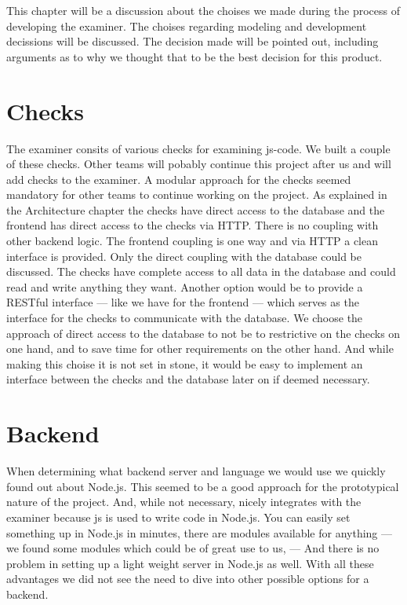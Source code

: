 %

This chapter will be a discussion about the choises we made
during the process of developing the \gls{examiner}.
The choises regarding modeling and development decissions will be discussed.
The decision made will be pointed out,
including arguments as to why we thought
that to be the best decision for this product.

\section{Checks}
The \gls{examiner} consits of various checks for examining \gls{js-code}.
We built a couple of these checks.
Other teams will pobably continue this project after us
and will add checks to the \gls{examiner}.
A modular approach for the checks seemed mandatory
for other teams to continue working on the project.
As explained in the Architecture chapter
the checks have direct access to the database
and the frontend has direct access to the checks via HTTP.
There is no coupling with other backend logic.
The frontend coupling is one way
and via HTTP a clean interface is provided.
Only the direct coupling with the database could be discussed.
The checks have complete access to all data in the database
and could read and write anything they want.
Another option would be to provide a RESTful interface ---
like we have for the frontend ---
which serves as the interface for the checks to communicate with the database.
We choose the approach of direct access to the database
to not be to restrictive on the checks on one hand,
and to save time for other requirements on the other hand.
And while making this choise it is not set in stone,
it would be easy to implement an interface
between the checks and the database later on if deemed necessary.

\section{Backend}
When determining what backend server and language we would use
we quickly found out about Node.js.
This seemed to be a good approach for the prototypical nature of the project.
And, while not necessary, nicely integrates with the \gls{examiner}
because \gls{js} is used to write code in Node.js.
You can easily set something up in Node.js in minutes,
there are modules available for anything
--- we found some modules which could be of great use to us, ---
And there is no problem in setting up a light weight server in Node.js as well.
With all these advantages we did not see the need
to dive into other possible options for a backend.

